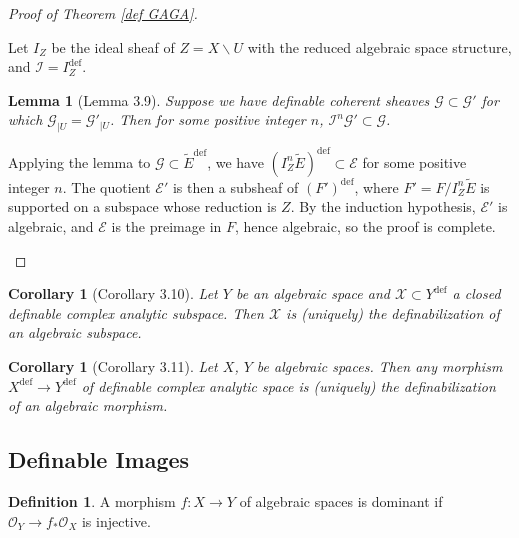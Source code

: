 \documentclass{amsart}
\newtheorem{lemma}[theorem]{Lemma}
\newtheorem{corollary}[theorem]{Corollary}
\theoremstyle{definition}
\newtheorem{definition}[theorem]{Definition}
\numberwithin{equation}{section}
\newcommand{\definable}{\mathrm{def}}
\begin{document}
\begin{proof}[Proof of Theorem \ref{def GAGA}]
\begin{enumerate}[label = {Step \arabic*.}]
        Let $I_Z$ be the ideal sheaf of $Z = X \backslash U$ with the reduced algebraic space structure,
        and $\mathcal{I} = I_Z^{\definable}$.
        \begin{lemma}[Lemma 3.9]
            Suppose we have definable coherent sheaves $\mathcal{G} \subset \mathcal{G}'$
            for which $\mathcal{G}_{|U} = \mathcal{G}'_{|U}$.
            Then for some positive integer $n$, $\mathcal{I}^n\mathcal{G}' \subset \mathcal{G}$.
        \end{lemma}
        Applying the lemma to $\mathcal{G} \subset \widetilde{E}^{\definable}$,
        we have $(I^n_Z\widetilde{E})^{\definable} \subset \mathcal{E}$ for some positive integer $n$.
        The quotient $\mathcal{E}'$ is then a subsheaf of $(F')^{\definable}$,
        where $F' = F/I^n_Z\widetilde{E}$ is supported on a subspace whose reduction is $Z$.
        By the induction hypothesis, $\mathcal{E}'$ is algebraic,
        and $\mathcal{E}$ is the preimage in $F$,
        hence algebraic, so the proof is complete.
    \end{enumerate}
\end{proof}

\begin{corollary}[Corollary 3.10]
    Let $Y$ be an algebraic space and $\mathcal{X} \subset Y^{\definable}$ a closed definable complex analytic subspace.
    Then $\mathcal{X}$ is (uniquely) the definabilization of an algebraic subspace.
\end{corollary}

\begin{corollary}[Corollary 3.11]
    Let $X$, $Y$ be algebraic spaces.
    Then any morphism $X^{\definable} \to Y^{\definable}$ of definable complex analytic space is (uniquely)
    the definabilization of an algebraic morphism.
\end{corollary}

\subsection{Definable Images}

\begin{definition}
    A morphism $f:X \to Y$ of algebraic spaces is dominant if $\mathcal{O}_Y \to f_*\mathcal{O}_X$ is injective.
\end{definition}
\end{document}
